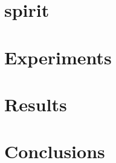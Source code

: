 \chapter{\acrlong{spirit}}
\label{ch:spirit}

\chapter{Experiments}
\label{ch:experiments}

\chapter{Results}
\label{ch:results}

\chapter{Conclusions}
\label{ch:conclusion}
